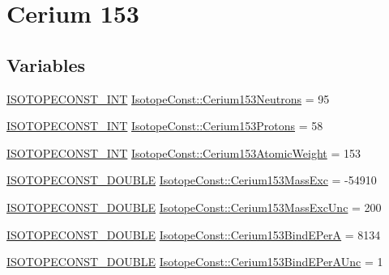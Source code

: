 \hypertarget{group___isotope_const-_cerium-_ce153}{}\section{Cerium 153}
\label{group___isotope_const-_cerium-_ce153}
\subsection*{Variables}
\begin{DoxyCompactItemize}
\item 
\mbox{\hyperlink{group___isotope_const-_macros_ga5f18360b3e99483a35c32d789e62621c}{I\+S\+O\+T\+O\+P\+E\+C\+O\+N\+S\+T\+\_\+\+I\+NT}} \mbox{\hyperlink{group___isotope_const-_cerium-_ce153_gaf0affbd852455327e5513d206fc15feb}{Isotope\+Const\+::\+Cerium153\+Neutrons}} = 95
\item 
\mbox{\hyperlink{group___isotope_const-_macros_ga5f18360b3e99483a35c32d789e62621c}{I\+S\+O\+T\+O\+P\+E\+C\+O\+N\+S\+T\+\_\+\+I\+NT}} \mbox{\hyperlink{group___isotope_const-_cerium-_ce153_gad6efdfdf9998500c7ceca2f13850862a}{Isotope\+Const\+::\+Cerium153\+Protons}} = 58
\item 
\mbox{\hyperlink{group___isotope_const-_macros_ga5f18360b3e99483a35c32d789e62621c}{I\+S\+O\+T\+O\+P\+E\+C\+O\+N\+S\+T\+\_\+\+I\+NT}} \mbox{\hyperlink{group___isotope_const-_cerium-_ce153_gaa2d6578f046146213e4eaa68e8599ad2}{Isotope\+Const\+::\+Cerium153\+Atomic\+Weight}} = 153
\item 
\mbox{\hyperlink{group___isotope_const-_macros_ga8f45a7272ce02c0b4c65c44636ed719a}{I\+S\+O\+T\+O\+P\+E\+C\+O\+N\+S\+T\+\_\+\+D\+O\+U\+B\+LE}} \mbox{\hyperlink{group___isotope_const-_cerium-_ce153_gad8294eaf86fdf21070e56a7502289d37}{Isotope\+Const\+::\+Cerium153\+Mass\+Exc}} = -\/54910
\item 
\mbox{\hyperlink{group___isotope_const-_macros_ga8f45a7272ce02c0b4c65c44636ed719a}{I\+S\+O\+T\+O\+P\+E\+C\+O\+N\+S\+T\+\_\+\+D\+O\+U\+B\+LE}} \mbox{\hyperlink{group___isotope_const-_cerium-_ce153_ga67d59a4cd0d0a12ab5877431717246b1}{Isotope\+Const\+::\+Cerium153\+Mass\+Exc\+Unc}} = 200
\item 
\mbox{\hyperlink{group___isotope_const-_macros_ga8f45a7272ce02c0b4c65c44636ed719a}{I\+S\+O\+T\+O\+P\+E\+C\+O\+N\+S\+T\+\_\+\+D\+O\+U\+B\+LE}} \mbox{\hyperlink{group___isotope_const-_cerium-_ce153_ga22c4b0d62e35a509598f415d304a611d}{Isotope\+Const\+::\+Cerium153\+Bind\+E\+PerA}} = 8134
\item 
\mbox{\hyperlink{group___isotope_const-_macros_ga8f45a7272ce02c0b4c65c44636ed719a}{I\+S\+O\+T\+O\+P\+E\+C\+O\+N\+S\+T\+\_\+\+D\+O\+U\+B\+LE}} \mbox{\hyperlink{group___isotope_const-_cerium-_ce153_ga3d965c481e4748752354e7b25b18a234}{Isotope\+Const\+::\+Cerium153\+Bind\+E\+Per\+A\+Unc}} = 1

\end{DoxyCompactItemize}
